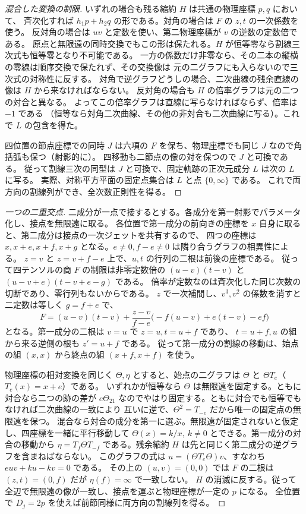\begin{proof}[混合した変換の制限]
いずれの場合も残る縮約 $H$ は共通の物理座標 $p,q$ において、
斉次化すれば $h_1p+h_2q$ の形である。対角の場合は $F$ の $z,t$ の一次係数を使う。
反対角の場合は $uv$ と定数を使い、第二物理座標が $v$ の逆数の定数倍である。
原点と無限遠の同時交換でもこの形は保たれる。$H$ が恒等零なら割線三次式も恒等零となり不可能である。
一方の係数だけ非零なら、その二本の縦横の零線は順序交換で保たれず、その交換像は
元の二グラフにも入らないので三次式の対称性に反する。
対角で逆グラフどうしの場合、二次曲線の残余直線の像は $H$ から来なければならない。
反対角の場合も $H$ の倍率グラフは元の二つの対合と異なる。
よってこの倍率グラフは直線に写らなければならず、倍率は $-1$ である
（恒等なら対角二次曲線、その他の非対合も二次曲線に写る）。これで $L$ の包含を得た。

四位置の節点座標での同時 $J$ は六項の $F$ を保ち、物理座標でも同じ $J$ なので角括弧も保つ（射影的に）。
四移動も二節点の像の対を保つので $J$ と可換である。
従って割線三次の同型は $J$ と可換で、固定軌跡の正次元成分 $L$ は次の $L$ に写る。
実際、対称平方平面の固定点集合は $L$ と点 $\{0,\infty\}$ である。
これで両方向の割線列ができ、全次数正則性を得る。
\end{proof}

\begin{proof}[一つの二重交点]
二成分が一点で接するとする。各成分を第一射影でパラメータ化し、接点を無限遠に取る。
各位置で第一成分の前向きの座標を $x$ 自身に取ると、第二成分は接点の一次ジェットを共有するので、
四つの座標は $x,x+e,x+f,x+g$ となる。$e\ne0,f-e\ne0$ は隣り合うグラフの相異性による。
$z=v$ と $z=v+f-e$ 上で、$u,t$ の行列の二根は前後の座標である。
従って四テンソルの商 $F$ の制限は非零定数倍の $(u-v)(t-v)$ と $(u-v+e)(t-v+e-g)$ である。
倍率が定数なのは斉次化した同じ次数の切断であり、零行列もないからである。
$z$ で一次補間し、$v^3,v^2$ の係数を消すと二定数は等しく $g=f+e$ で、
\[
 F=(u-v)(t-v)+\frac{z-v}{f-e}\bigl(-f(u-v)+e(t-v)-ef\bigr)
\]
となる。第一成分の二根は $v=u$ で $z=u,t=u+f$ であり、
$t=u+f,u$ の組から来る逆側の根も $z'=u+f$ である。
従って第一成分の割線の移動は、始点の組 $(x,x)$ から終点の組 $(x+f,x+f)$ を使う。

物理座標の相対変換を同じく $\Theta,\eta$ とすると、始点の二グラフは
$\Theta$ と $\Theta T_e$（$T_e(x)=x+e$）である。
いずれかが恒等なら $\Theta$ は無限遠を固定する。ともに対合なら二つの跡の差が
$e\Theta_{21}$ なのでやはり固定する。ともに対合でも恒等でもなければ二次曲線の一致により
互いに逆で、$\Theta^2=T_{-e}$ だから唯一の固定点の無限遠を保つ。
混合なら対合の成分を第一に選ぶ。無限遠が固定されないと仮定し、四座標を一緒に平行移動して
$\Theta(x)=k/x,\ k\ne0$ とできる。第一成分の対合の移動から
$\eta=T_f\Theta T_{-f}$ である。残余縮約 $H$ は先と同じく第二成分の逆グラフを含まねばならない。
このグラフの式は $u=(\Theta T_e\Theta)v$、すなわち $euv+ku-kv=0$ である。
その上の $(u,v)=(0,0)$ では $F$ の二根は $(z,t)=(0,f)$ だが $\eta(f)=\infty$ で一致しない。
$H$ の消滅に反する。従って全辺で無限遠の像が一致し、接点を運ぶと物理座標が一定の $p$ になる。
全位置で $D_j=2p$ を使えば前節同様に両方向の割線列を得る。
\end{proof}

